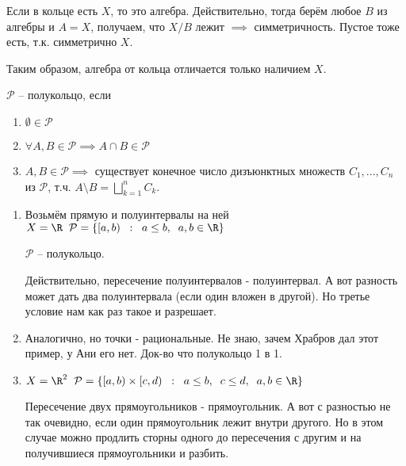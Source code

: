 \begin{remark}\thmslashn
	
	Если в кольце есть $X$, то это алгебра. Действительно, тогда берём любое $B$ из алгебры и $A=X$, получаем, что $X/B$ лежит $\implies$ симметричность. Пустое тоже есть, т.к. симметрично $X$.

	
\end{remark}

Таким образом, алгебра от кольца отличается только наличием $X$.


\begin{definition}\thmslashn
	
	$\mathcal{P}$ -- полукольцо, если 
	
	\begin{enumerate}
		\item $\emptyset \in \mathcal{P}$
		
		\item $\forall A,B \in \mathcal{P} \implies A\cap B \in \mathcal{P}$
		
		\item $A, B \in \mathcal{P} \implies$ существует конечное число дизъюнктных множеств $C_1,...,C_n$ из $\mathcal{P}$, т.ч. $A\setminus B = \bigsqcup\limits_{k=1}^{n} C_k$.
	\end{enumerate}
	
	
\end{definition}

\begin{example}\thmslashn
	
	\begin{enumerate}
		\item 
		Возьмём прямую и полуинтервалы на ней
		$X = \R \;\; \mathcal{P} = \{[a,b) \;\;:\;\; a\le b,\;\;a,b \in \R\}$
	
		$\mathcal{P}$ -- полукольцо.

		Действительно, пересечение полуинтервалов - полуинтервал. А вот разность может дать два полуинтервала (если один вложен в другой). Но третье условие нам как раз такое и разрешает.

		\item 
			Аналогично, но точки - рациональные. Не знаю, зачем Храбров дал этот пример, у Ани его нет. Док-во что полукольцо 1 в 1.
		\item 
			$X = \R^2 \;\; \mathcal{P} = \{[a,b)\times [c,d) \;\;:\;\; a\le b,\;\; c\le d,\;\; a,b \in \R\}$
			
			Пересечение двух прямоугольников - прямоугольник. А вот с разностью не так очевидно, если один прямоугольник лежит внутри другого. Но в этом случае можно продлить сторны одного до пересечения с другим и на получившиеся прямоугольники и разбить.

	\end{enumerate}
\end{example}

